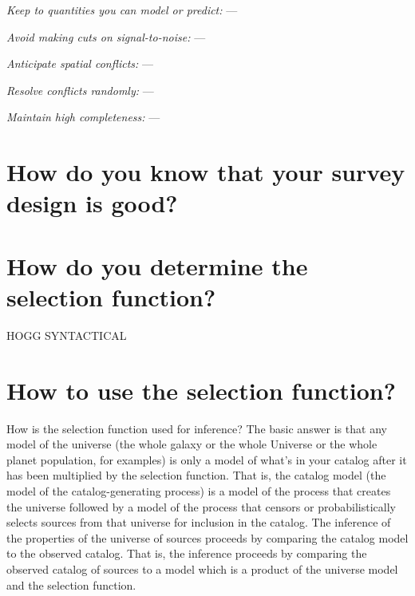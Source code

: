 \documentclass[modern]{aastex62}
\renewcommand{\paragraph}[1]{\medskip\noindent\textit{#1} ---}
\begin{document}
\paragraph{Keep to quantities you can model or predict:}

\paragraph{Avoid making cuts on signal-to-noise:}

\paragraph{Anticipate spatial conflicts:}

\paragraph{Resolve conflicts randomly:}

\paragraph{Maintain high completeness:}

\section{How do you know that your survey design is good?}\label{sec:verify}

\section{How do you determine the selection function?}\label{sec:estimate}

HOGG SYNTACTICAL

\section{How to use the selection function?}\label{sec:howto}

How is the selection function used for inference?
The basic answer is that any model of the universe (the whole galaxy
or the whole Universe or the whole planet population, for examples)
is only a model of what's in your catalog after it has been multiplied
by the selection function.
That is, the catalog model (the model of the catalog-generating process)
is a model of the process that
creates the universe followed by a model of the process that censors or
probabilistically selects sources from that universe for inclusion in the catalog.
The inference of the properties of the universe of sources proceeds
by comparing the catalog model to the observed catalog.
That is, the inference  proceeds by comparing the observed catalog
of sources to a model which is a product of the universe model and the
selection function.
\end{document}

